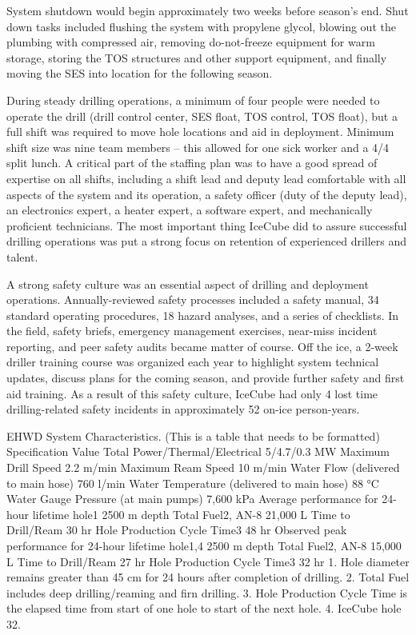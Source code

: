 System shutdown would begin approximately two weeks before season’s end.  Shut down tasks included flushing the system with propylene glycol, blowing out the plumbing with compressed air, removing do-not-freeze equipment for warm storage, storing the TOS structures and other support equipment, and finally moving the SES into location for the following season.

During steady drilling operations, a minimum of four people were needed to operate the drill (drill control center, SES float, TOS control, TOS float), but a full shift was required to move hole locations and aid in deployment.  Minimum shift size was nine team members – this allowed for one sick worker and a 4/4 split lunch.  A critical part of the staffing plan was to have a good spread of expertise on all shifts, including a shift lead and deputy lead comfortable with all aspects of the system and its operation, a safety officer (duty of the deputy lead), an electronics expert, a heater expert, a software expert, and mechanically proficient technicians.  The most important thing IceCube did to assure successful drilling operations was put a strong focus on retention of experienced drillers and talent.

A strong safety culture was an essential aspect of drilling and deployment operations.  Annually-reviewed safety processes included a safety manual, 34 standard operating procedures, 18 hazard analyses, and a series of checklists.  In the field, safety briefs, emergency management exercises, near-miss incident reporting, and peer safety audits became matter of course.  Off the ice, a 2-week driller training course was organized each year to highlight system technical updates, discuss plans for the coming season, and provide further safety and first aid training.  As a result of this safety culture, IceCube had only 4 lost time drilling-related safety incidents in approximately 52 on-ice person-years.

EHWD System Characteristics. (This is a table that needs to be formatted)
Specification
Value
Total Power/Thermal/Electrical
5/4.7/0.3 MW
Maximum Drill Speed
2.2 m/min
Maximum Ream Speed
10 m/min
Water Flow (delivered to main hose)
760 l/min
Water Temperature (delivered to main hose)
88 °C
Water Gauge Pressure (at main pumps)
7,600 kPa
Average performance for 24-hour lifetime hole1
2500 m depth
    Total Fuel2, AN-8
21,000 L
    Time to Drill/Ream
30 hr
    Hole Production Cycle Time3
48 hr
Observed peak performance for 24-hour lifetime hole1,4
2500 m depth
    Total Fuel2, AN-8
15,000 L
    Time to Drill/Ream
27 hr
    Hole Production Cycle Time3
32 hr
1.	Hole diameter remains greater than 45 cm for 24 hours after completion of drilling.
2.	Total Fuel includes deep drilling/reaming and firn drilling.
3.	Hole Production Cycle Time is the elapsed time from start of one hole to start of the next hole.
4.	IceCube hole 32.

